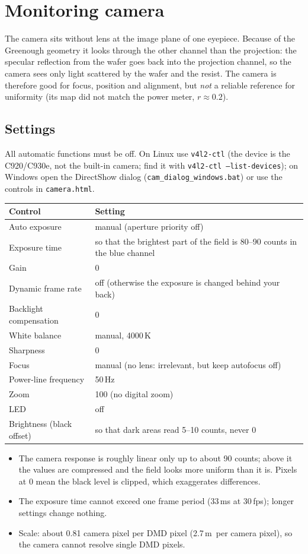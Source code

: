 \documentclass[11pt,a4paper]{article}
\newcommand{\um}{\,\textmu m}
\newcommand{\file}[1]{\texttt{#1}}
\begin{document}
\section{Monitoring camera}
\label{sec:camera}
The camera sits without lens at the image plane of one eyepiece. Because of the Greenough geometry it looks through
the other channel than the projection: the specular reflection from the wafer goes back into the projection channel,
so the camera sees only light scattered by the wafer and the resist. The camera is therefore good for focus, position
and alignment, but \emph{not} a reliable reference for uniformity (its map did not match the power meter, $r\approx0.2$).

\subsection{Settings}
All automatic functions must be off. On Linux use \file{v4l2-ctl} (the device is the C920/C930e, not the built-in
camera; find it with \file{v4l2-ctl --list-devices}); on Windows open the DirectShow dialog
(\file{cam\_dialog\_windows.bat}) or use the controls in \file{camera.html}.
\begin{table}[H]\centering\small
\begin{tabular}{@{}ll@{}}
\toprule
Control & Setting \\
\midrule
Auto exposure & manual (aperture priority off) \\
Exposure time & so that the brightest part of the field is 80--90 counts in the blue channel \\
Gain & 0 \\
Dynamic frame rate & off (otherwise the exposure is changed behind your back) \\
Backlight compensation & 0 \\
White balance & manual, 4000\,K \\
Sharpness & 0 \\
Focus & manual (no lens: irrelevant, but keep autofocus off) \\
Power-line frequency & 50\,Hz \\
Zoom & 100 (no digital zoom) \\
LED & off \\
Brightness (black offset) & so that dark areas read 5--10 counts, never 0 \\
\bottomrule
\end{tabular}
\end{table}
\begin{itemize}
  \item The camera response is roughly linear only up to about 90 counts; above it the values are compressed and the
        field looks more uniform than it is. Pixels at 0 mean the black level is clipped, which exaggerates differences.
  \item The exposure time cannot exceed one frame period (33\,ms at 30\,fps); longer settings change nothing.
  \item Scale: about 0.81 camera pixel per DMD pixel (2.7\um\ per camera pixel), so the camera cannot resolve single
        DMD pixels.
\end{itemize}
\end{document}
